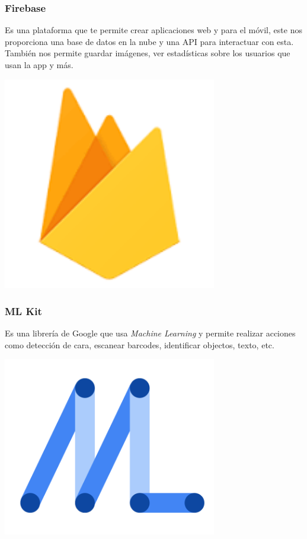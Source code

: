 \documentclass[12pt,a4paper]{article}
\begin{document}
\subsubsection{Firebase}

\begin{minipage}{.75\textwidth}
Es una plataforma que te permite crear aplicaciones web y para el móvil, este nos proporciona una base de datos en la nube y una API para interactuar con esta. También nos permite guardar imágenes, ver estadísticas sobre los usuarios que usan la app y más.
\end{minipage} %
\begin{minipage}{.25\textwidth}
  \includegraphics[width=0.7\textwidth, right]{firebase}
\end{minipage}

\subsubsection{ML Kit}

\begin{minipage}{.75\textwidth}
Es una librería de Google que usa \textit{Machine Learning} y permite realizar acciones como detección de cara, escanear barcodes, identificar objectos, texto, etc.
\end{minipage} %
\begin{minipage}{.25\textwidth}
  \includegraphics[width=0.7\textwidth, right]{mlkit}
 \end{minipage}
\end{document}
